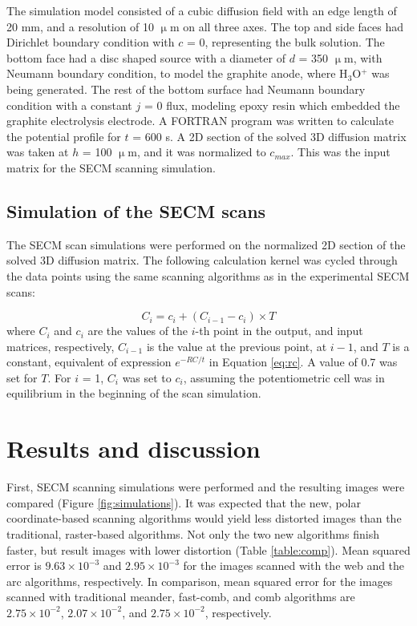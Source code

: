 \documentclass[3p]{elsarticle}
\begin{document}
The simulation model consisted of a cubic diffusion field with an edge length of 20 mm, and a resolution of 10 $\upmu$m on all three axes. The top and side faces had Dirichlet boundary condition with $c$ = 0, representing the bulk solution. The bottom face had a disc shaped source with a diameter of $d$ = 350 $\upmu$m, with Neumann boundary condition, to model the graphite anode, where H$_3$O$^{+}$ was being generated. The rest of the bottom surface had Neumann boundary condition with a constant $j$ = 0 flux, modeling epoxy resin which embedded the graphite electrolysis electrode. A FORTRAN program was written to calculate the potential profile for $t$ = 600 s. A 2D section of the solved 3D diffusion matrix was taken at $h$ = 100 $\upmu$m, and it was normalized to $c_{max}$. This was the input matrix for the SECM scanning simulation.

\subsection{Simulation of the SECM scans}
The SECM scan simulations were performed on the normalized 2D section of the solved 3D diffusion matrix. The following calculation kernel was cycled through the data points using the same scanning algorithms as in the experimental SECM scans:

\begin{equation}
\label{eq:scan}
C_i = c_i + ( C_{i-1} - c_i ) \times T
\end{equation}
where $C_i$ and $c_i$ are the values of the $i$-th point in the output, and input matrices, respectively, $C_{i-1}$ is the value at the previous point, at $i-1$, and $T$ is a constant, equivalent of expression $e^{-RC/t}$ in Equation \ref{eq:rc}. A value of 0.7 was set for $T$. For $i$ = 1, $C_i$ was set to $c_i$, assuming the potentiometric cell was in equilibrium in the beginning of the scan simulation.

\section{Results and discussion}
First, SECM scanning simulations were performed and the resulting images were compared (Figure \ref{fig:simulations}). It was expected that the new, polar coordinate-based scanning algorithms would yield less distorted images than the traditional, raster-based algorithms. Not only the two new algorithms finish faster, but result images with lower distortion (Table \ref{table:comp}). Mean squared error is $9.63\times 10^{-3}$ and $2.95\times 10^{-3}$ for the images scanned with the web and the arc algorithms, respectively. In comparison, mean squared error for the images scanned with traditional meander, fast-comb, and comb algorithms are $2.75\times 10^{-2}$, $2.07\times 10^{-2}$, and $2.75\times 10^{-2}$, respectively.
\end{document}

